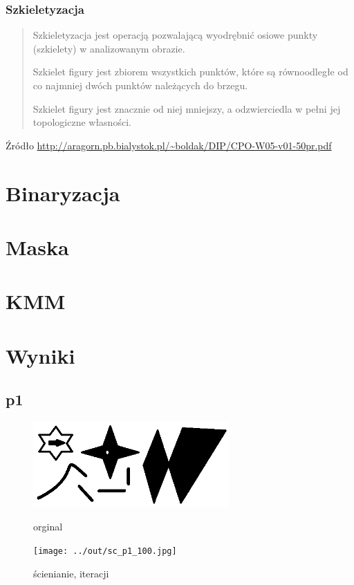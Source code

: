 \documentclass[a4paper,12pt]{article}
\begin{document}
\subsubsection{Szkieletyzacja}
\begin{quote}
Szkieletyzacja jest operacją pozwalającą wyodrębnić osiowe punkty
(szkielety) w analizowanym obrazie.

Szkielet figury jest zbiorem wszystkich punktów, które są
równoodległe od co najmniej dwóch punktów należących
do brzegu.

Szkielet figury jest znacznie od niej mniejszy, a odzwierciedla w pełni jej
topologiczne własności.
\end{quote}
Źródło \url{http://aragorn.pb.bialystok.pl/~boldak/DIP/CPO-W05-v01-50pr.pdf}

\newpage

\section{Binaryzacja}


\section{Maska}


\section{KMM}


\newpage

\section{Wyniki}

\subsection{p1}

\begin{figure}[h!]
\begin{minipage}[t]{7.5cm}
\begin{center}
\includegraphics[width=7.5cm]{../in/p1.jpg}
\caption{orginal}
\end{center}
\end{minipage}
\hfill
\begin{minipage}[t]{7.5cm}
\begin{center}
\texttt{[image: ../out/sc\_p1\_100.jpg]}
\caption{ścienianie, \protect iteracji}
\end{center}
\end{minipage}
\end{figure}
\end{document}
